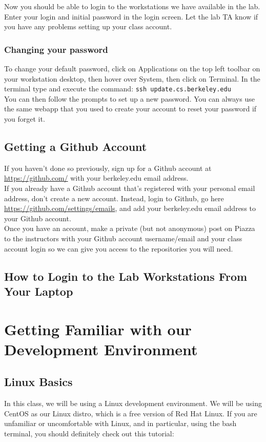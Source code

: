 \documentclass[11pt]{article}
\begin{document}
Now you should be able to login to the workstations we have available in the lab. Enter your login and initial password in the login screen. Let the lab TA know if you have any problems setting up your class account.

\subsubsection{Changing your password}
To change your default password, click on Applications on the top left toolbar on your workstation desktop, then hover over System, then click on Terminal. In the terminal type and execute the command: \verb|ssh update.cs.berkeley.edu| \\

You can then follow the prompts to set up a new password. You can always use the same webapp that you used to create your account to reset your password if you forget it.

\subsection{Getting a Github Account}
If you haven't done so previously, sign up for a Github account at \url{https://github.com/} with your berkeley.edu email address. \\

If you already have a Github account that's registered with your personal email address, don't create a new account. Instead, login to Github, go here \url{https://github.com/settings/emails}, and add your berkeley.edu email address to your Github account.\\

Once you have an account, make a private (but not anonymous) post on Piazza to the instructors with your Github account username/email and your class account login so we can give you access to the repositories you will need.

\subsection{How to Login to the Lab Workstations From Your Laptop}

\section{Getting Familiar with our Development Environment}
\subsection{Linux Basics}
In this class, we will be using a Linux development environment. We will be using CentOS as our Linux distro, which is a free version of Red Hat Linux. If you are unfamiliar or uncomfortable with Linux, and in particular, using the bash terminal, you should definitely check out this tutorial: \\
\end{document}
